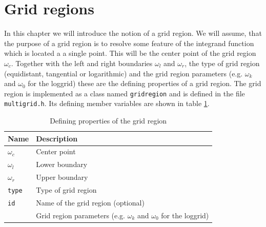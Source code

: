 \section{Grid regions}\label{sec:grid_regions}
In this chapter we will introduce the notion of a grid region. We will assume, that the purpose of a grid region is to resolve some feature of the integrand function which is located a a single point. This will be the center point of the grid region $\omega_c$. Together with the left and right boundaries $\omega_l$ and $\omega_r$, the type of grid region (equidistant, tangential or logarithmic) and the grid region parameters (e.g. $\omega_k$ and $\omega_0$ for the loggrid) these are the defining properties of a grid region. The grid region is implemented as a class named \texttt{gridregion} and is defined in the file \texttt{multigrid.h}. Its defining member variables are shown in table \ref{tab:grid_region_defining_members}.
\begin{table}[h]
	\begin{center}
		\begin{tabular}{ll}
		Name & Description \\ 
		\hline
		$\omega_c$  & Center point \\
		$\omega_l$  & Lower boundary \\
		$\omega_r$  & Upper boundary \\
		\texttt{type}  & Type of grid region \\
		\texttt{id}  & Name of the grid region (optional) \\
		 & Grid region parameters (e.g. $\omega_k$ and $\omega_0$ for the loggrid) \\
		\end{tabular}
	\end{center}
	\caption{Defining properties of the grid region}
	\label{tab:grid_region_defining_members}
\end{table}

